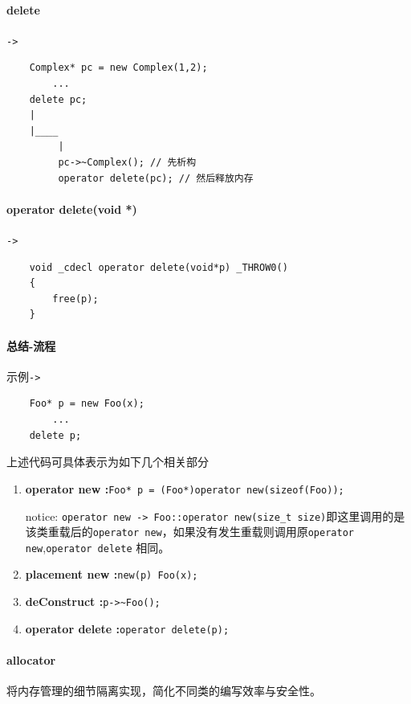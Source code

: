 \documentclass[UTF8,a4paper,12pt]{ctexbook}
\begin{document}
			\newpage		
			\paragraph{delete}\verb|->|
				\begin{lstlisting}
	Complex* pc = new Complex(1,2);
		...
	delete pc;
	|
	|____
		 |
		 pc->~Complex(); // 先析构
		 operator delete(pc); // 然后释放内存
				\end{lstlisting}
	
			\paragraph{operator delete(void *)}\verb|->|
				\begin{lstlisting}
	void _cdecl operator delete(void*p) _THROW0()
	{
		free(p);
	}
				\end{lstlisting}
		
			\paragraph{总结-流程}示例\verb|->|
				\begin{lstlisting}
	Foo* p = new Foo(x);
		...
	delete p;
				\end{lstlisting}
	
				上述代码可具体表示为如下几个相关部分
				\begin{enumerate}[itemindent = 1em]
					\item \textbf{operator new :}\verb|Foo* p = (Foo*)operator new(sizeof(Foo));|
					
						notice: \verb|operator new -> Foo::operator new(size_t size)|即这里调用的是该类重载后的\verb|operator new|，如果没有发生重载则调用原\verb|operator new|,\verb|operator delete| 相同。
						
					\item \textbf{placement new :}\verb|new(p) Foo(x);|
					\item \textbf{deConstruct :}\verb|p->~Foo();|
					\item \textbf{operator delete :}\verb|operator delete(p);|
				\end{enumerate}
			
			\newpage	
			\paragraph{allocator}
				将内存管理的细节隔离实现，简化不同类的编写效率与安全性。
				
\end{document}
